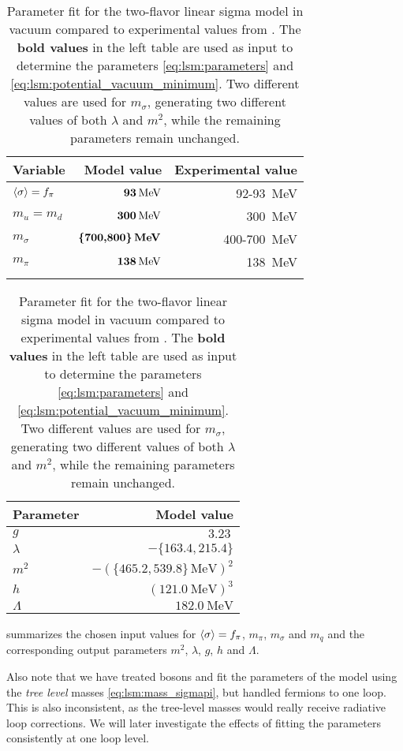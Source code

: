 \begin{table}
\centering
\begin{tabular}{ l r r }
	\toprule
	Variable & Model value                             & Experimental value \\
	\midrule
	$\langle \sigma \rangle=f_\pi$ & $\textbf{\SI{93}{\mega\electronvolt}}$  & \SI{92}{}-\SI{93}{\mega\electronvolt} \\
	$m_u=m_d$            & $\textbf{\SI{300}{\mega\electronvolt}}$ & \approx \, \SI{300}{\mega\electronvolt} \\
	$m_\sigma$           & $\textbf{\{700,800\}\,\si{\mega\electronvolt}}$ & \SI{400}{}-\SI{700}{\mega\electronvolt}          \\
	$m_\pi$              & $\textbf{\SI{138}{\mega\electronvolt}}$ & \SI{138}{\mega\electronvolt}                     \\
	\\
	\bottomrule
\end{tabular}
\hfill
\begin{tabular}{ l r }
	\toprule
	Parameter   & Model value                           \\
	\midrule
	$g$         & $\SI{3.23}{}$                         \\
	$\lambda$   & $-\{163.4,215.4\}$                        \\
	$m^2$       & $-(\{465.2,539.8\} \, \si{\mega\electronvolt})^2$ \\
	$h$         & $(\SI{121.0}{\mega\electronvolt})^3$  \\
	$\Lambda$   & $\SI{182.0}{\mega\electronvolt}$ \\
	\bottomrule
\end{tabular}
\caption{\label{tab:lsm2f:parameters}%
Parameter fit for the two-flavor linear sigma model in vacuum compared to experimental values from \cite{ref:pdg_review_2021}.
The \textbf{bold values} in the left table are used as input to determine the parameters \eqref{eq:lsm:parameters} and \eqref{eq:lsm:potential_vacuum_minimum}.
Two different values are used for $m_\sigma$, generating two different values of both $\lambda$ and $m^2$, while the remaining parameters remain unchanged.
}
\end{table}

 summarizes the chosen input values for $\langle \sigma \rangle=f_\pi$, $m_\pi$, $m_\sigma$ and $m_q$ and the corresponding output parameters $m^2$, $\lambda$, $g$, $h$ and $\Lambda$.

Also note that we have treated bosons and fit the parameters of the model using the \emph{tree level} masses \eqref{eq:lsm:mass_sigmapi},
but handled fermions to one loop. 
This is also inconsistent, as the tree-level masses would really receive radiative loop corrections.
We will later investigate the effects of fitting the parameters consistently at one loop level.

